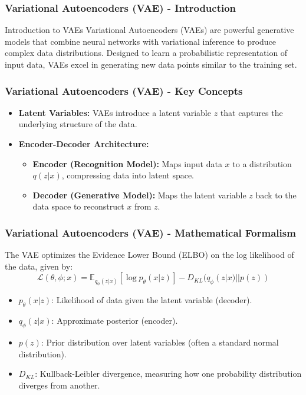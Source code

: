 \documentclass[aspectratio=169]{beamer}
\begin{document}
\begin{frame}[fragile]
    \frametitle{Variational Autoencoders (VAE) - Introduction}
    \begin{block}{Introduction to VAEs}
        Variational Autoencoders (VAEs) are powerful generative models that combine neural networks with variational inference to produce complex data distributions.
        Designed to learn a probabilistic representation of input data, VAEs excel in generating new data points similar to the training set.
    \end{block}
\end{frame}

\begin{frame}[fragile]
    \frametitle{Variational Autoencoders (VAE) - Key Concepts}
    \begin{itemize}
        \item \textbf{Latent Variables:} VAEs introduce a latent variable $z$ that captures the underlying structure of the data.
        \item \textbf{Encoder-Decoder Architecture:}
        \begin{itemize}
            \item \textbf{Encoder (Recognition Model):} Maps input data $x$ to a distribution $q(z|x)$, compressing data into latent space.
            \item \textbf{Decoder (Generative Model):} Maps the latent variable $z$ back to the data space to reconstruct $x$ from $z$.
        \end{itemize}
    \end{itemize}
\end{frame}

\begin{frame}[fragile]
    \frametitle{Variational Autoencoders (VAE) - Mathematical Formalism}
    The VAE optimizes the Evidence Lower Bound (ELBO) on the log likelihood of the data, given by:
    \begin{equation}
    \mathcal{L}(\theta, \phi; x) = \mathbb{E}_{q_\phi(z|x)}[\log p_\theta(x|z)] - D_{KL}(q_\phi(z|x) || p(z))
    \end{equation}
    \begin{itemize}
        \item $p_\theta(x|z)$: Likelihood of data given the latent variable (decoder).
        \item $q_\phi(z|x)$: Approximate posterior (encoder).
        \item $p(z)$: Prior distribution over latent variables (often a standard normal distribution).
        \item $D_{KL}$: Kullback-Leibler divergence, measuring how one probability distribution diverges from another.
    \end{itemize}
\end{frame}
\end{document}
